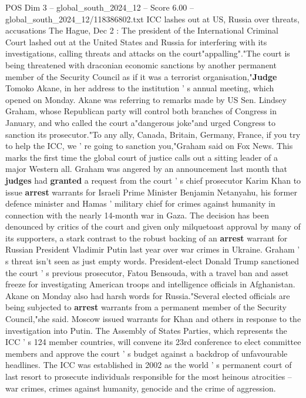 \begin{textsample}{POS Dim 3 – global\_south\_2024\_12 – Score 6.00 – global\_south\_2024\_12/118386802.txt}  \label{ex:f3_pos_394}
ICC lashes out at US, Russia over threats, accusations The Hague, Dec 2 : The president of the International Criminal Court lashed out at the United States and Russia for interfering with its investigations, calling threats and attacks on the court"appalling"."The court is being threatened with draconian economic sanctions by another permanent member of the Security Council as if it was a terrorist organisation,"\textbf{Judge} Tomoko Akane, in her address to the institution ' s annual meeting, which opened on Monday.
Akane was referring to remarks made by US Sen.
Lindsey Graham, whose Republican party will control both branches of Congress in January, and who called the court a"dangerous joke"and urged Congress to sanction its prosecutor."To any ally, Canada, Britain, Germany, France, if you try to help the ICC, we ' re going to sanction you,"Graham said on Fox News.
This marks the first time the global court of justice calls out a sitting leader of a major Western all.
Graham was angered by an announcement last month that \textbf{judges} had \textbf{granted} a request from the court ' s chief prosecutor Karim Khan to issue \textbf{arrest} warrants for Israeli Prime Minister Benjamin Netanyahu, his former defence minister and Hamas ' military chief for crimes against humanity in connection with the nearly 14-month war in Gaza.
The decision has been denounced by critics of the court and given only milquetoast approval by many of its supporters, a stark contrast to the robust backing of an \textbf{arrest} warrant for Russian President Vladimir Putin last year over war crimes in Ukraine.
Graham ' s threat isn't seen as just empty words.
President-elect Donald Trump sanctioned the court ' s previous prosecutor, Fatou Bensouda, with a travel ban and asset freeze for investigating American troops and intelligence officials in Afghanistan.
Akane on Monday also had harsh words for Russia."Several elected officials are being subjected to \textbf{arrest} warrants from a permanent member of the Security Council,"she said.
Moscow issued warrants for Khan and others in response to the investigation into Putin.
The Assembly of States Parties, which represents the ICC ' s 124 member countries, will convene its 23rd conference to elect committee members and approve the court ' s budget against a backdrop of unfavourable headlines.
The ICC was established in 2002 as the world ' s permanent court of last resort to prosecute individuals responsible for the most heinous atrocities -- war crimes, crimes against humanity, genocide and the crime of aggression.

\end{textsample}
